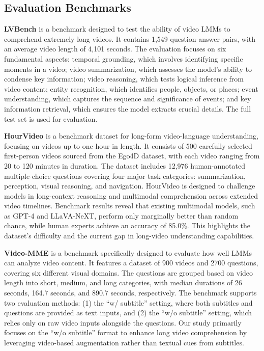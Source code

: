 \subsection{Evaluation Benchmarks}

\noindent\textbf{LVBench} \cite{wang2024lvbench} is a benchmark designed to test the ability of video LMMs to comprehend extremely long videos. It contains 1,549 question-answer pairs, with an average video length of 4,101 seconds. The evaluation focuses on six fundamental aspects: temporal grounding, which involves identifying specific moments in a video; video summarization, which assesses the model's ability to condense key information; video reasoning, which tests logical inference from video content; entity recognition, which identifies people, objects, or places; event understanding, which captures the sequence and significance of events; and key information retrieval, which ensures the model extracts crucial details. The full test set is used for evaluation.

\noindent\textbf{HourVideo} \cite{chandrasegaran2025hourvideo} is a benchmark dataset for long-form video-language understanding, focusing on videos up to one hour in length. It consists of 500 carefully selected first-person videos sourced from the Ego4D \cite{grauman2022ego4d} dataset, with each video ranging from 20 to 120 minutes in duration. The dataset includes 12,976 human-annotated multiple-choice questions covering four major task categories: summarization, perception, visual reasoning, and navigation. HourVideo is designed to challenge models in long-context reasoning and multimodal comprehension across extended video timelines. Benchmark results reveal that existing multimodal models, such as GPT-4 and LLaVA-NeXT, perform only marginally better than random chance, while human experts achieve an accuracy of 85.0\%. This highlights the dataset's difficulty and the current gap in long-video understanding capabilities.

\noindent\textbf{Video-MME} \cite{fu2024video} is a benchmark specifically designed to evaluate how well LMMs can analyze video content. It features a dataset of 900 videos and 2700 questions, covering six different visual domains. The questions are grouped based on video length into short, medium, and long categories, with median durations of 26 seconds, 164.7 seconds, and 890.7 seconds, respectively. The benchmark supports two evaluation methods: (1) the “w/ subtitle” setting, where both subtitles and questions are provided as text inputs, and (2) the “w/o subtitle” setting, which relies only on raw video inputs alongside the questions. Our study primarily focuses on the “w/o subtitle” format to enhance long video comprehension by leveraging video-based augmentation rather than textual cues from subtitles.

